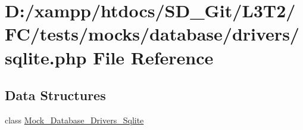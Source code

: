 \hypertarget{drivers_2sqlite_8php}{}\section{D\+:/xampp/htdocs/\+S\+D\+\_\+\+Git/\+L3\+T2/\+F\+C/tests/mocks/database/drivers/sqlite.php File Reference}
\label{drivers_2sqlite_8php}
\subsection*{Data Structures}
\begin{DoxyCompactItemize}
\item 
class \hyperlink{class_mock___database___drivers___sqlite}{Mock\+\_\+\+Database\+\_\+\+Drivers\+\_\+\+Sqlite}
\end{DoxyCompactItemize}
